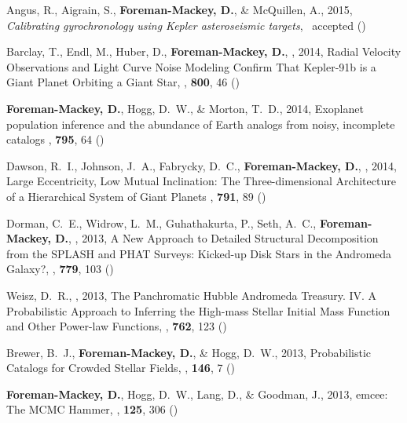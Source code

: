 \item Angus, R., Aigrain, S., {\bf Foreman-Mackey, D.}, \& McQuillen, A., 2015,
    \emph{Calibrating gyrochronology using Kepler asteroseismic targets},
    \mnras\ accepted ()

\item Barclay, T., Endl, M.,  Huber, D., {\bf Foreman-Mackey, D.}, \etal, 2014,
        {Radial Velocity Observations and Light Curve Noise Modeling Confirm
         That Kepler-91b is a Giant Planet Orbiting a Giant Star},
    \apj, \textbf{800}, 46 ()

\item {\bf Foreman-Mackey, D.}, Hogg, D.~W., \& Morton, T.~D., 2014,
        {Exoplanet population inference and the abundance of Earth analogs
         from noisy, incomplete catalogs}
    \apj, \textbf{795}, 64 ()

\item Dawson, R.~I., Johnson,  J.~A., Fabrycky, D.~C.,
    {\bf Foreman-Mackey, D.}, \etal, 2014,
        {Large Eccentricity, Low Mutual Inclination: The Three-dimensional
         Architecture of a Hierarchical System of Giant Planets}
    \apj, \textbf{791}, 89 ()

\item Dorman, C.~E., Widrow, L.~M., Guhathakurta, P., Seth, A.~C.,
    {\bf Foreman-Mackey, D.}, \etal, 2013,
        {A New Approach to Detailed Structural Decomposition from the SPLASH
         and PHAT Surveys: Kicked-up Disk Stars in the Andromeda Galaxy?},
    \apj, \textbf{779}, 103 ()

\item Weisz, D.~R., \etal, 2013,
        {The Panchromatic Hubble Andromeda Treasury. IV. A Probabilistic
         Approach to Inferring the High-mass Stellar Initial Mass Function and
         Other Power-law Functions},
    \apj, \textbf{762}, 123 ()

\item Brewer, B.~J., {\bf Foreman-Mackey, D.}, \& Hogg, D.~W., 2013,
        {Probabilistic Catalogs for Crowded Stellar Fields},
    \aj, \textbf{146}, 7 ()

\item {\bf Foreman-Mackey, D.}, Hogg, D.~W., Lang, D., \& Goodman, J., 2013,
        {emcee: The MCMC Hammer},
    \pasp, \textbf{125}, 306 ()
